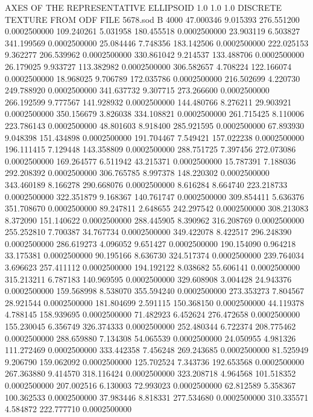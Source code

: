 AXES OF THE REPRESENTATIVE ELLIPSOID
   1.0   1.0   1.0
DISCRETE TEXTURE FROM ODF FILE  5678.sod                                
B   4000
47.000346 9.015393 276.551200 0.0002500000
109.240261 5.031958 180.455518 0.0002500000
23.903119 6.503827 341.199569 0.0002500000
25.084446 7.748356 183.142506 0.0002500000
222.025153 9.362277 206.539962 0.0002500000
330.861042 9.214537 133.488706 0.0002500000
26.179025 9.933727 113.382982 0.0002500000
306.582657 4.708224 122.166074 0.0002500000
18.968025 9.706789 172.035786 0.0002500000
216.502699 4.220730 249.788920 0.0002500000
341.637732 9.307715 273.266600 0.0002500000
266.192599 9.777567 141.928932 0.0002500000
144.480766 8.276211 29.903921 0.0002500000
350.156679 3.826038 334.108821 0.0002500000
261.715425 8.110006 223.786143 0.0002500000
48.801603 8.918400 285.921595 0.0002500000
67.893930 9.048398 151.434898 0.0002500000
191.704467 7.549421 157.022238 0.0002500000
196.111415 7.129448 143.358809 0.0002500000
288.751725 7.397456 272.073086 0.0002500000
169.264577 6.511942 43.215371 0.0002500000
15.787391 7.188036 292.208392 0.0002500000
306.765785 8.997378 148.220302 0.0002500000
343.460189 8.166278 290.668076 0.0002500000
8.616284 8.664740 223.218733 0.0002500000
322.351879 9.168367 140.761747 0.0002500000
309.854411 5.636376 351.708670 0.0002500000
89.247811 2.648655 242.297542 0.0002500000
308.213083 8.372090 151.140622 0.0002500000
288.445905 8.390962 316.208769 0.0002500000
255.252810 7.700387 34.767734 0.0002500000
349.422078 8.422517 296.248390 0.0002500000
286.619273 4.096052 9.651427 0.0002500000
190.154090 0.964218 33.175381 0.0002500000
90.195166 8.636730 324.517374 0.0002500000
239.764034 3.696623 257.411112 0.0002500000
194.192122 8.038682 55.606141 0.0002500000
315.213211 6.787183 140.969595 0.0002500000
329.608908 3.004428 24.943376 0.0002500000
159.568998 8.538070 355.594240 0.0002500000
273.353273 7.804567 28.921544 0.0002500000
181.804699 2.591115 150.368150 0.0002500000
44.119378 4.788145 158.939695 0.0002500000
71.482923 6.452624 276.472658 0.0002500000
155.230045 6.356749 326.374333 0.0002500000
252.480344 6.722374 208.775462 0.0002500000
288.659880 7.134308 54.065539 0.0002500000
24.050955 4.981326 111.272469 0.0002500000
333.442358 7.456248 269.243685 0.0002500000
81.525949 9.206790 159.062092 0.0002500000
125.702524 7.343736 192.653568 0.0002500000
267.363880 9.414570 318.116424 0.0002500000
323.208718 4.964568 101.518352 0.0002500000
207.002516 6.130003 72.993023 0.0002500000
62.812589 5.358367 100.362533 0.0002500000
37.983446 8.818331 277.534680 0.0002500000
310.335571 4.584872 222.777710 0.0002500000
